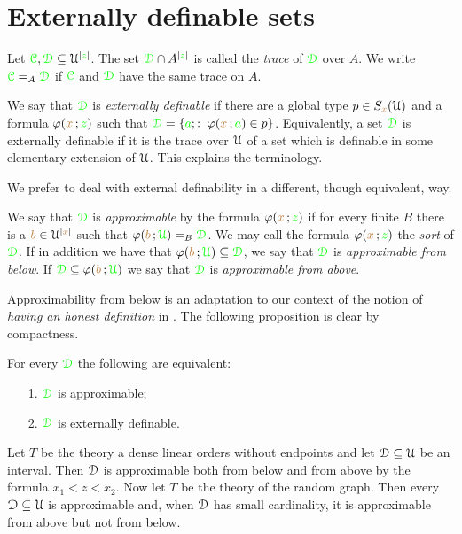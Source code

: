 \documentclass[creche.tex]{subfiles}
\begin{document}
\chapter{Externally definable sets}
\label{external}


Let ${\color{green}\EuScript C},{\color{green}\EuScript D}\subseteq\EuScript U^{|{\color{green} z}|}$. The set ${\color{green}\EuScript D}\cap A^{|{\color{green} z}|}$ is called the \emph{trace\/} of ${\color{green}\EuScript D}$ over $A$. We write ${\color{green}\EuScript C}=_A{\color{green}\EuScript D}$ if  ${\color{green}\EuScript C}$ and ${\color{green}\EuScript D}$ have the same trace on $A$.

We say that ${\color{green}\EuScript D}$ is \emph{externally definable\/} if there are a global type $p\in S_{\color{brown} x}(\EuScript U)$ and a formula $\varphi({\color{brown} x}\,;{\color{green} z})$ such that ${\color{green}\EuScript D}=\{{\color{green} a};:\;\varphi({\color{brown} x}\,;{\color{green} a})\in p\}$. Equivalently, a set ${\color{green}\EuScript D}$ is externally definable if it is the trace over $\EuScript U$ of a set which is definable in some elementary extension of $\EuScript U$. This explains the terminology.

We prefer to deal with external definability in a different, though equivalent, way. 

\begin{definition}\label{def_epprox}
We say that ${\color{green}\EuScript D}$ is \emph{approximable\/} by the formula $\varphi({\color{brown} x}\,;{\color{green} z})$ if for every finite $B$ there is a ${\color{brown} b}\in\EuScript U^{|{\color{brown} x}|}$ such that $\varphi({\color{brown} b}\,;{\color{green}\EuScript U})=_B{\color{green}\EuScript D}$. We may call the formula $\varphi({\color{brown} x}\,;{\color{green} z})$ the \emph{sort} of ${\color{green}\EuScript D}$. If in addition we have that $\varphi({\color{brown} b}\,;{\color{green}\EuScript U})\subseteq{\color{green}\EuScript D}$, we say that  ${\color{green}\EuScript D}$ is \emph{approximable from below}. If  ${\color{green}\EuScript D}\subseteq\varphi({\color{brown} b}\,;{\color{green}\EuScript U})$ we say that  ${\color{green}\EuScript D}$ is \emph{approximable from above}.\QED
\end{definition} 

Approximability from below is an adaptation to our context of the notion of \textit{having an honest definition} in \cite{CS}.  The following proposition is clear by compactness.

\begin{proposition}\label{lem_approx=external}
For every ${\color{green}\EuScript D}$ the following are equivalent:
\begin{itemize}
\item[1.] ${\color{green}\EuScript D}$ is approximable;
\item[2.] ${\color{green}\EuScript D}$ is externally definable.\QED 
\end{itemize}
\end{proposition}

\begin{example}
Let $T$ be the theory a dense linear orders without endpoints and let $\EuScript D\subseteq\EuScript U$ be an interval. Then $\EuScript D$ is approximable both from below and from above by the formula \mbox{$x_1<z<x_2$}.  Now let $T$ be the theory of the random graph. Then every $\EuScript D\subseteq\EuScript U$ is approximable and, when $\EuScript D$ has small cardinality, it is approximable from above but not from below.\QED
\end{example}
\end{document}

